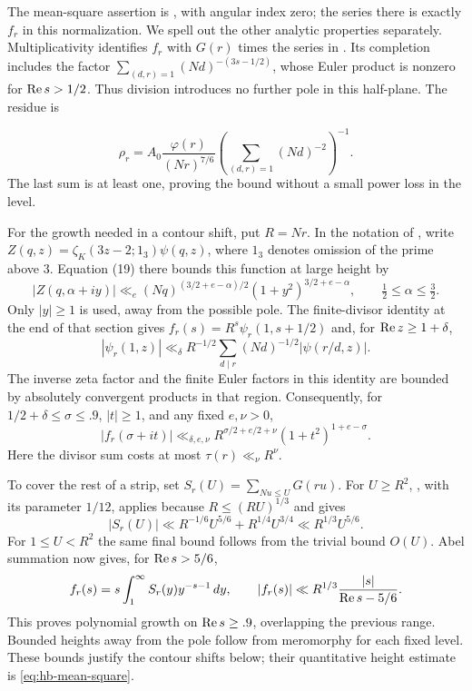 The mean-square assertion is \cite[Section 3, Lemma 3]{HB2000}, with
angular index zero; the series there is exactly $f_r$ in this
normalization. We spell out the other analytic properties separately.
Multiplicativity identifies $f_r$ with $G(r)$ times the series in
\cite[Proposition 5.2]{DR2024}. Its completion includes the factor
$\sum_{(d,r)=1}(Nd)^{-(3s-1/2)}$, whose Euler product is nonzero for
$\operatorname{Re} s>1/2$. Thus division introduces no further pole in this
half-plane. The residue is

\begin{equation}
 \rho_r=A_0\frac{\varphi(r)}{(Nr)^{7/6}}
       \left(\sum_{(d,r)=1}(Nd)^{-2}\right)^{-1}.
 \label{eq:typeI-residue}
\end{equation}
The last sum is at least one, proving the bound without a small power
loss in the level.

For the growth needed in a contour shift, put $R=Nr$. In the notation
of \cite[Section 3, Equation (14)]{HB2000}, write
$Z(q,z)=\zeta_K(3z-2;1_3)\psi(q,z)$, where $1_3$ denotes omission
of the prime above $3$. Equation (19) there bounds this function at
large height by
\[
 |Z(q,\alpha+iy)|\ll_e
 (Nq)^{(3/2+e-\alpha)/2}(1+y^2)^{3/2+e-\alpha},
 \qquad \tfrac12\le\alpha\le\tfrac32.
\]
Only $|y|\ge1$ is used, away from the possible pole. The finite-divisor
identity at the end of that section gives
$f_r(s)=R^s\psi_r(1,s+1/2)$ and, for $\operatorname{Re} z\ge1+\delta$,
\[
 |\psi_r(1,z)|\ll_\delta R^{-1/2}
       \sum_{d\mid r}(Nd)^{-1/2}|\psi(r/d,z)|.
\]
The inverse zeta factor and the finite Euler factors in this identity
are bounded by absolutely convergent products in that region.
Consequently, for $1/2+\delta\le\sigma\le.9$, $|t|\ge1$, and any
fixed $e,\nu>0$,
\[
 |f_r(\sigma+it)|\ll_{\delta,e,\nu}
 R^{\sigma/2+e/2+\nu}(1+t^2)^{1+e-\sigma}.
\]
Here the divisor sum costs at most $\tau(r)\ll_\nu R^\nu$.

To cover the rest of a strip, set
$S_r(U)=\sum_{Nu\le U}G(ru)$. For $U\ge R^2$,
\cite[Lemma 1]{HB2000}, with its parameter $1/12$, applies because
$R\le(RU)^{1/3}$ and gives
\[
 |S_r(U)|\ll R^{-1/6}U^{5/6}+R^{1/4}U^{3/4}
           \ll R^{1/3}U^{5/6}.
\]
For $1\le U<R^2$ the same final bound follows from the trivial bound
$O(U)$. Abel summation now gives, for $\operatorname{Re} s>5/6$,
\[
 f_r(s)=s\int_1^\infty S_r(y)y^{-s-1}\,dy,
 \qquad
 |f_r(s)|\ll R^{1/3}\frac{|s|}{\operatorname{Re} s-5/6}.
\]
This proves polynomial growth on $\operatorname{Re} s\ge.9$, overlapping the
previous range. Bounded heights away from the pole follow from
meromorphy for each fixed level. These bounds justify the contour
shifts below; their quantitative height estimate is
\eqref{eq:hb-mean-square}.


